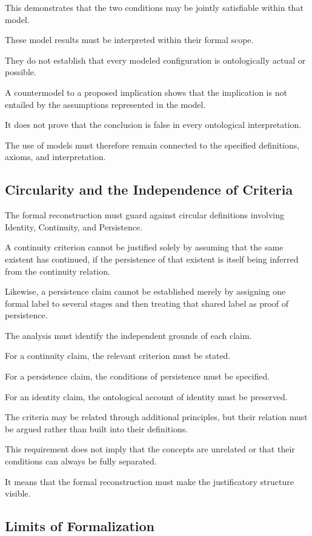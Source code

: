 This demonstrates
that the two conditions
may be jointly satisfiable
within that model.

These model results
must be interpreted
within their formal
scope.

They do not establish
that every modeled
configuration is
ontologically actual
or possible.

A countermodel to
a proposed implication
shows that the implication
is not entailed by
the assumptions represented
in the model.

It does not prove
that the conclusion
is false in every
ontological interpretation.

The use of models
must therefore remain
connected to the
specified definitions,
axioms, and interpretation.

\subsection{Circularity and the Independence of Criteria}

The formal reconstruction
must guard against
circular definitions
involving Identity,
Continuity, and Persistence.

A continuity criterion
cannot be justified
solely by assuming
that the same existent
has continued, if
the persistence of
that existent is itself
being inferred from
the continuity relation.

Likewise, a persistence
claim cannot be established
merely by assigning
one formal label
to several stages
and then treating
that shared label
as proof of persistence.

The analysis must
identify the independent
grounds of each claim.

For a continuity claim,
the relevant criterion
must be stated.

For a persistence claim,
the conditions of
persistence must be
specified.

For an identity claim,
the ontological account
of identity must be
preserved.

The criteria may
be related through
additional principles,
but their relation
must be argued rather
than built into their
definitions.

This requirement
does not imply that
the concepts are
unrelated or that
their conditions can
always be fully separated.

It means that the
formal reconstruction
must make the
justificatory structure
visible.

\subsection{Limits of Formalization}

